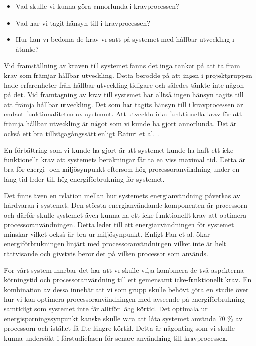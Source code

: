 \begin{itemize}
	\item Vad skulle vi kunna göra annorlunda i kravprocessen?
	\item Vad har vi tagit hänsyn till i kravprocessen?
	\item Hur kan vi bedöma de krav vi satt på systemet med hållbar utveckling i åtanke?
\end{itemize}

Vid framställning av kraven till systemet fanns det inga tankar på att ta fram krav som främjar hållbar utveckling. Detta berodde på att ingen i projektgruppen hade erfarenheter från hållbar utveckling tidigare och således tänkte inte någon på det. Vid framtagning av krav till systemet har alltså ingen hänsyn tagits till att främja hållbar utveckling. Det som har tagits hänsyn till i kravprocessen är endast funktionaliteten av systemet. Att utveckla icke-funktionella krav för att främja hållbar utveckling är något som vi kunde ha gjort annorlunda. Det är också ett bra tillvägagångssätt enligt Raturi et al. \cite{raturi2014developing}.

En förbättring som vi kunde ha gjort är att systemet kunde ha haft ett icke-funktionellt krav att systemets beräkningar får ta en viss maximal tid. Detta är bra för energi- och miljösynpunkt eftersom hög processoranvändning under en lång tid leder till hög energiförbrukning för systemet.

Det finns även en relation mellan hur systemets energianvändning påverkas av hårdvaran i systemet. Den största energianvändande komponenten är processorn och därför skulle systemet även kunna ha ett icke-funktionellt krav att optimera processoranvändningen. Detta leder till att energianvändningen för systemet minskar vilket också är bra ur miljösynpunkt. Enligt Fan et al. \cite{fan2007power} ökar energiförbrukningen linjärt med processoranvändningen vilket inte är helt rättvisande och givetvis beror det på vilken processor som används.

För vårt system innebär det här att vi skulle vilja kombinera de två aspekterna körningstid och processoranvändning till ett gemensamt icke-funktionellt krav. En kombination av dessa innebär att vi som grupp skulle behövt göra en studie över hur vi kan optimera processoranvändningen med avseende på energiförbrukning samtidigt som systemet inte får alltför lång körtid. Det optimala ur energisparningssynpunkt kanske skulle vara att låta systemet använda 70 \% av processorn och istället få lite längre körtid. Detta är någonting som vi skulle kunna undersökt i förstudiefasen för senare användning till kravprocessen.

